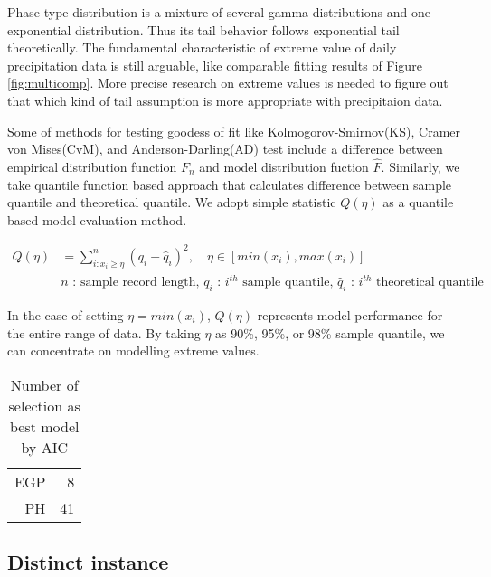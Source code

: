\documentclass[12pt]{article}\usepackage[]{graphicx}\usepackage[]{color}
\begin{document}
Phase-type distribution is a mixture of several gamma distributions and one exponential distribution. Thus its tail behavior follows exponential tail theoretically. The fundamental characteristic of extreme value of daily precipitation data is still arguable, like comparable fitting results of Figure \ref{fig:multicomp}. More precise research on extreme values is needed to figure out that which kind of tail assumption is more appropriate with precipitaion data. 

Some of methods for testing goodess of fit like Kolmogorov-Smirnov(KS), Cramer von Mises(CvM), and Anderson-Darling(AD) test include a difference between empirical distribution function $F_n$ and model distribution fuction $\hat{F}$. Similarly, we take quantile function based approach that calculates difference between sample quantile and theoretical quantile. We adopt simple statistic $Q(\eta)$ as a quantile based model evaluation method. 


\begin{align} 
  \label{eq:quantile_match}
  Q(\eta) &= \sum_{i:x_i \geq \eta}^n (q_i - \hat{q}_i)^2, \quad \eta \in [min(x_i), max(x_i)] \\ 
  & \text{$n$ : sample record length, $q_i$ : $i^{th}$ sample quantile, $\hat{q}_i$ : $i^{th}$ theoretical quantile} \nonumber
\end{align}


In the case of setting $\eta = min(x_i)$, $Q(\eta)$ represents model performance for the entire range of data. By taking $\eta$ as 90\%, 95\%, or 98\% sample quantile, we can concentrate on modelling extreme values.


\begin{table}[ht]
\centering
\begin{tabular}{rr}
  \toprule
  \midrule
EGP &   8 \\ 
  PH &  41 \\ 
   \bottomrule
\end{tabular}
\caption{Number of selection as best model by AIC} 
\label{tab:quantmatch}
\end{table}




  \subsection{Distinct instance}
\end{document}
